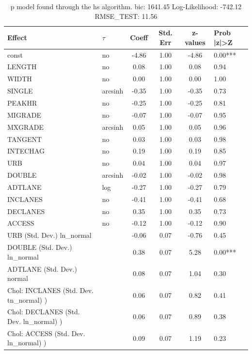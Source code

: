 \begin{table}
	\caption{p model found through the hs algorithm. bic: 1641.45 Log-Likelihood: -742.12 RMSE_TEST: 11.56}
	\begin{center}
		\begin{tabular}{|l|l|c|c|c|l|}
			\hline
			Effect & $\tau$ & Coeff & Std. Err & z-values & Prob |z|>Z \\
			\hline
			const & no & -4.86 & 1.00 & -4.86 & 0.00*** \\
			\hline
			LENGTH & no & 0.08 & 1.00 & 0.08 & 0.94 \\
			\hline
			WIDTH & no & 0.00 & 1.00 & 0.00 & 1.00 \\
			\hline
			SINGLE & arcsinh & -0.35 & 1.00 & -0.35 & 0.73 \\
			\hline
			PEAKHR & no & -0.25 & 1.00 & -0.25 & 0.81 \\
			\hline
			MIGRADE & no & -0.07 & 1.00 & -0.07 & 0.95 \\
			\hline
			MXGRADE & arcsinh & 0.05 & 1.00 & 0.05 & 0.96 \\
			\hline
			TANGENT & no & 0.03 & 1.00 & 0.03 & 0.98 \\
			\hline
			INTECHAG & no & 0.19 & 1.00 & 0.19 & 0.85 \\
			\hline
			URB & no & 0.04 & 1.00 & 0.04 & 0.97 \\
			\hline
			DOUBLE & arcsinh & -0.02 & 1.00 & -0.02 & 0.98 \\
			\hline
			ADTLANE & log & -0.27 & 1.00 & -0.27 & 0.79 \\
			\hline
			INCLANES & no & -0.41 & 1.00 & -0.41 & 0.68 \\
			\hline
			DECLANES & no & 0.35 & 1.00 & 0.35 & 0.73 \\
			\hline
			ACCESS & no & -0.12 & 1.00 & -0.12 & 0.90 \\
			\hline
			URB (Std. Dev.) ln_normal &  & -0.06 & 0.07 & -0.76 & 0.45 \\
			\hline
			DOUBLE (Std. Dev.) ln_normal &  & 0.38 & 0.07 & 5.28 & 0.00*** \\
			\hline
			ADTLANE (Std. Dev.) normal &  & 0.08 & 0.07 & 1.04 & 0.30 \\
			\hline
			 Chol: INCLANES (Std. Dev. tn_normal) ) &  & 0.06 & 0.07 & 0.82 & 0.41 \\
			\hline
			 Chol: DECLANES (Std. Dev. ln_normal) ) &  & 0.06 & 0.07 & 0.89 & 0.38 \\
			\hline
			 Chol: ACCESS (Std. Dev. ln_normal) ) &  & 0.09 & 0.07 & 1.19 & 0.23 \\

\end{tabular}
\end{center}
\end{table}
